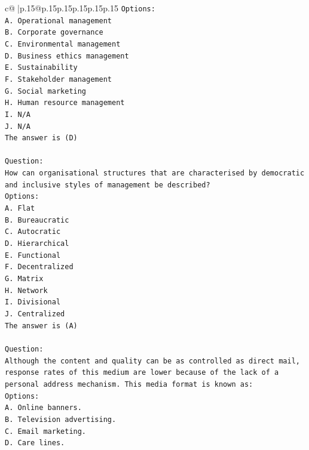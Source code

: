 \documentclass{article}
\begin{document}
{\begin{supertabular}{c@{$\;$}|p{.15\linewidth}@{}p{.15\linewidth}p{.15\linewidth}p{.15\linewidth}p{.15\linewidth}p{.15\linewidth}}
{{{\texttt{Options:} \\
\texttt{A. Operational management} \\
\texttt{B. Corporate governance} \\
\texttt{C. Environmental management} \\
\texttt{D. Business ethics management} \\
\texttt{E. Sustainability} \\
\texttt{F. Stakeholder management} \\
\texttt{G. Social marketing} \\
\texttt{H. Human resource management} \\
\texttt{I. N/A} \\
\texttt{J. N/A} \\
\texttt{The answer is (D)} \\
\\ 
\texttt{Question:} \\
\texttt{How can organisational structures that are characterised by democratic and inclusive styles of management be described?} \\
\texttt{Options:} \\
\texttt{A. Flat} \\
\texttt{B. Bureaucratic} \\
\texttt{C. Autocratic} \\
\texttt{D. Hierarchical} \\
\texttt{E. Functional} \\
\texttt{F. Decentralized} \\
\texttt{G. Matrix} \\
\texttt{H. Network} \\
\texttt{I. Divisional} \\
\texttt{J. Centralized} \\
\texttt{The answer is (A)} \\
\\ 
\texttt{Question:} \\
\texttt{Although the content and quality can be as controlled as direct mail, response rates of this medium are lower because of the lack of a personal address mechanism. This media format is known as:} \\
\texttt{Options:} \\
\texttt{A. Online banners.} \\
\texttt{B. Television advertising.} \\
\texttt{C. Email marketing.} \\
\texttt{D. Care lines.} \\
}}}
\end{supertabular}}
\end{document}

